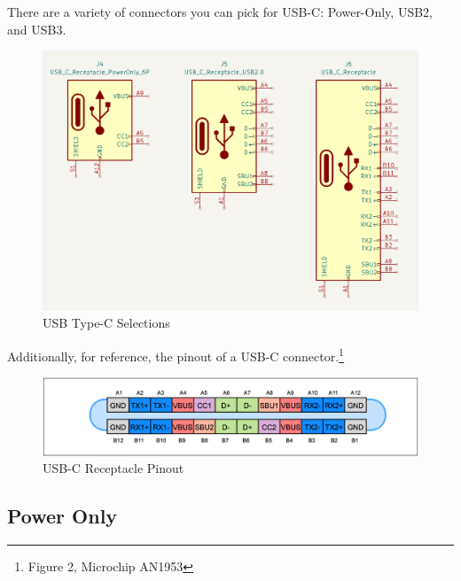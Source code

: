 \documentclass[12pt]{article}
\begin{document}
There are a variety of connectors you can pick for USB-C: Power-Only, USB2, and USB3. 

\begin{figure}[h]
	\centering
	\includegraphics[width=1\linewidth]{3-USB-C.png}
	\caption{USB Type-C Selections}
	\label{fig:usbc-3-ports}
\end{figure}

Additionally, for reference, the pinout of a USB-C connector.\footnote{Figure 2, Microchip AN1953}


\begin{figure}[h]
	\centering
	\includegraphics[width=1\linewidth]{microchip-pinout.png}
	\caption{USB-C Receptacle Pinout}
	\label{fig:usb-c-pinout-microchip}
\end{figure}

\newpage

\subsection{Power Only}
\end{document}

